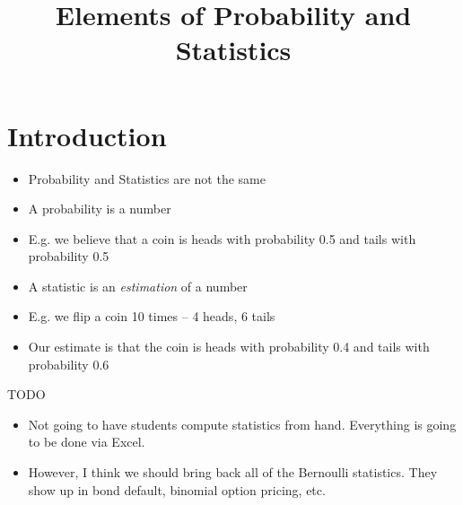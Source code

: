 \documentclass{beamer}
\title{Elements of Probability and Statistics}
\begin{document}
\maketitle

\section{Introduction}
\begin{frame}
	\begin{itemize}
		\item Probability and Statistics are not the same
		\item A probability is a number 
		\item E.g. we believe that a coin is heads with probability 0.5 and tails with probability 0.5
		\item A statistic is an \textit{estimation} of a number
		\item E.g. we flip a coin 10 times -- 4 heads, 6 tails
		\item Our estimate is that the coin is heads with probability 0.4 and tails with probability 0.6 
	\end{itemize}
\end{frame}

\begin{frame}{TODO}
	\begin{itemize}
		\item Not going to have students compute statistics from hand. Everything is going to be done via Excel.
		\item However, I think we should bring back all of the Bernoulli statistics. They show up in bond default, binomial option pricing, etc.
	\end{itemize}
\end{frame}
\end{document}
